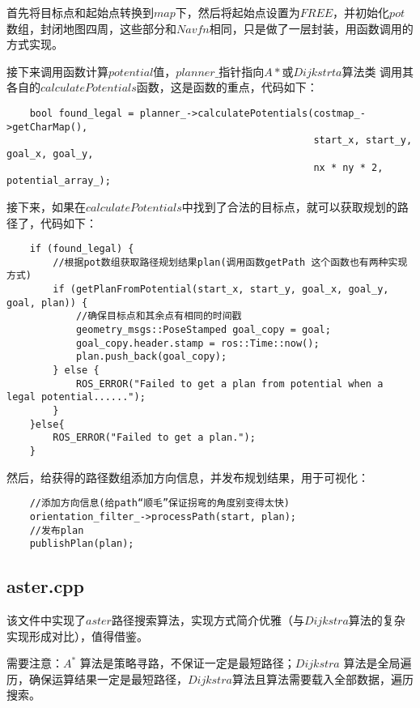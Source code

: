 \documentclass[9pt, oneside]{book}
\begin{document}
首先将目标点和起始点转换到$map$下，然后将起始点设置为$FREE$，并初始化$pot$数组，封闭地图四周，这些部分和$Navfn$相同，只是做了一层封装，用函数调用的方式实现。

接下来调用函数计算$potential$值，$planner\_$指针指向$A*$或$Dijkstrta$算法类 调用其各自的$calculatePotentials$函数，这是函数的重点，代码如下：

\small
\begin{verbatim}
    bool found_legal = planner_->calculatePotentials(costmap_->getCharMap(), 
                                                     start_x, start_y, goal_x, goal_y,
                                                     nx * ny * 2, potential_array_);

\end{verbatim}
\normalsize

接下来，如果在$calculatePotentials$中找到了合法的目标点，就可以获取规划的路径了，代码如下：

\small
\begin{verbatim}
    if (found_legal) {
        //根据pot数组获取路径规划结果plan(调用函数getPath 这个函数也有两种实现方式)
        if (getPlanFromPotential(start_x, start_y, goal_x, goal_y, goal, plan)) {
            //确保目标点和其余点有相同的时间戳
            geometry_msgs::PoseStamped goal_copy = goal;
            goal_copy.header.stamp = ros::Time::now();
            plan.push_back(goal_copy);
        } else {
            ROS_ERROR("Failed to get a plan from potential when a legal potential......");
        }
    }else{
        ROS_ERROR("Failed to get a plan.");
    }
\end{verbatim}
\normalsize

然后，给获得的路径数组添加方向信息，并发布规划结果，用于可视化：

\small
\begin{verbatim}
    //添加方向信息(给path“顺毛”保证拐弯的角度别变得太快)
    orientation_filter_->processPath(start, plan);
    //发布plan
    publishPlan(plan);
\end{verbatim}
\normalsize

\subsection{aster.cpp}

该文件中实现了$aster$路径搜索算法，实现方式简介优雅（与$Dijkstra$算法的复杂实现形成对比），值得借鉴。

需要注意：$A^*$ 算法是策略寻路，不保证一定是最短路径；$Dijkstra$ 算法是全局遍历，确保运算结果一定是最短路径，$Dijkstra$算法且算法需要载入全部数据，遍历搜索。
\end{document}
